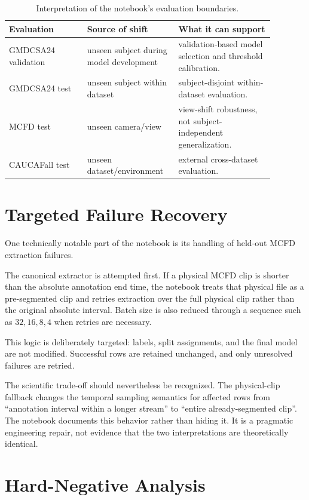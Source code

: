 \documentclass[11pt,a4paper]{article}
\begin{document}
\begin{table}[ht]
\centering
\small
\begin{tabular}{p{0.27\linewidth}p{0.28\linewidth}p{0.33\linewidth}}
\toprule
\textbf{Evaluation} & \textbf{Source of shift} & \textbf{What it can support} \\
\midrule
GMDCSA24 validation & unseen subject during model development & validation-based model selection and threshold calibration. \\
GMDCSA24 test & unseen subject within dataset & subject-disjoint within-dataset evaluation. \\
MCFD test & unseen camera/view & view-shift robustness, not subject-independent generalization. \\
CAUCAFall test & unseen dataset/environment & external cross-dataset evaluation. \\
\bottomrule
\end{tabular}
\caption{Interpretation of the notebook's evaluation boundaries.}
\end{table}

\section{Targeted Failure Recovery}

One technically notable part of the notebook is its handling of held-out MCFD extraction failures.

The canonical extractor is attempted first. If a physical MCFD clip is shorter than the absolute annotation end time, the notebook treats that physical file as a pre-segmented clip and retries extraction over the full physical clip rather than the original absolute interval. Batch size is also reduced through a sequence such as $32,16,8,4$ when retries are necessary.

This logic is deliberately targeted: labels, split assignments, and the final model are not modified. Successful rows are retained unchanged, and only unresolved failures are retried.

The scientific trade-off should nevertheless be recognized. The physical-clip fallback changes the temporal sampling semantics for affected rows from ``annotation interval within a longer stream'' to ``entire already-segmented clip''. The notebook documents this behavior rather than hiding it. It is a pragmatic engineering repair, not evidence that the two interpretations are theoretically identical.

\section{Hard-Negative Analysis}
\end{document}
